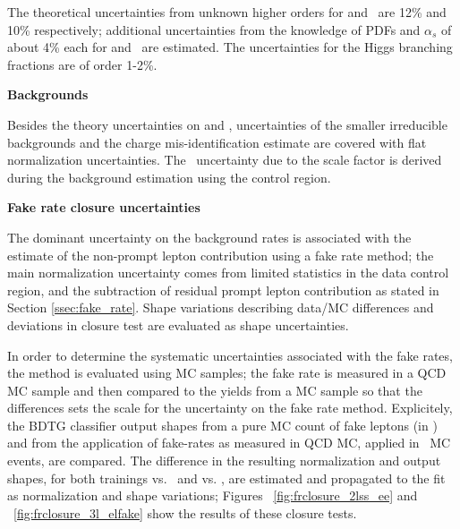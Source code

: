 The theoretical uncertainties from unknown higher orders for \ttW and \ttZ\ are 12\% and 10\% respectively; additional uncertainties from the knowledge of PDFs and $\alpha_s $ of about 4\% each for \ttW and \ttZ\ are estimated. The uncertainties for the Higgs branching fractions are of order 1-2\%.

\textbf{Backgrounds}

Besides the theory uncertainties on \ttW and \ttZ, uncertainties of the smaller irreducible backgrounds and the charge mis-identification estimate are covered with flat normalization uncertainties. The \WZ\ uncertainty due to the scale factor is derived during the background estimation using the control region.

\textbf{Fake rate closure uncertainties}

The dominant uncertainty on the background rates is associated with the estimate of the non-prompt lepton contribution using a fake rate method; the main normalization uncertainty comes from limited statistics in the data control region, and the subtraction of residual prompt lepton contribution as stated in Section \ref{ssec:fake_rate}. Shape variations describing data/MC differences and deviations in closure test are evaluated as shape uncertainties.

In order to determine the systematic uncertainties associated with the fake rates, the method is evaluated using MC samples; the fake rate is measured in a QCD MC sample and then compared to the yields from a MC \ttbar sample so that the differences sets the scale for the uncertainty on the fake rate method. Explicitely, the BDTG classifier output shapes from a pure MC count of fake leptons (in \ttbar) and from the application of fake-rates as measured in QCD MC, applied in \ttbar\ MC events, are compared. The difference in the resulting normalization and output shapes, for both trainings vs. \ttbar\ and vs. \ttV, are estimated and propagated to the fit as normalization and shape variations; Figures ~\ref{fig:frclosure_2lss_ee} and ~\ref{fig:frclosure_3l_elfake} show the results of these closure tests.



